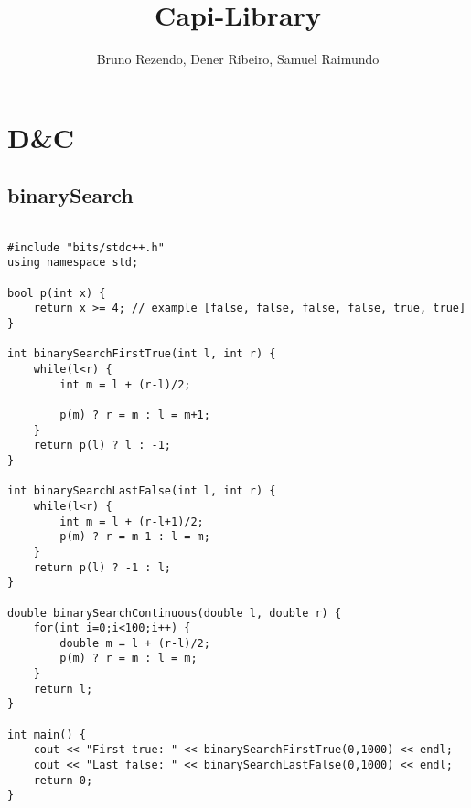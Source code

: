 \documentclass[landscape,twocolumn,10pt,a4paper]{article}
\title{Capi-Library
}
\author{Bruno Rezendo, Dener Ribeiro, Samuel Raimundo}
\begin{document}
\maketitle

\tableofcontents\section{D&C}
\subsection{binarySearch}
\begin{verbatim}

#include "bits/stdc++.h"
using namespace std;

bool p(int x) {
    return x >= 4; // example [false, false, false, false, true, true]
}

int binarySearchFirstTrue(int l, int r) {
    while(l<r) {
        int m = l + (r-l)/2;

        p(m) ? r = m : l = m+1;
    }
    return p(l) ? l : -1;
}

int binarySearchLastFalse(int l, int r) {
    while(l<r) {
        int m = l + (r-l+1)/2;
        p(m) ? r = m-1 : l = m;
    }
    return p(l) ? -1 : l;
}

double binarySearchContinuous(double l, double r) {
    for(int i=0;i<100;i++) {
        double m = l + (r-l)/2;
        p(m) ? r = m : l = m;
    }
    return l; 
}

int main() {
    cout << "First true: " << binarySearchFirstTrue(0,1000) << endl;
    cout << "Last false: " << binarySearchLastFalse(0,1000) << endl;
    return 0;
}\end{verbatim}
\end{document}
